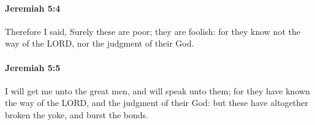 		\paragraph{Jeremiah 5:4} %
			\label{JEREMIAH-5-4}

			Therefore I said, Surely these are poor; they are foolish: for they know not the way of the LORD, nor the judgment of their God.


		\paragraph{Jeremiah 5:5} %
			\label{JEREMIAH-5-5}

			I will get me unto the great men, and will speak unto them; for they have known the way of the LORD, and the judgment of their God: but these have altogether broken the yoke, and burst the bonds.


